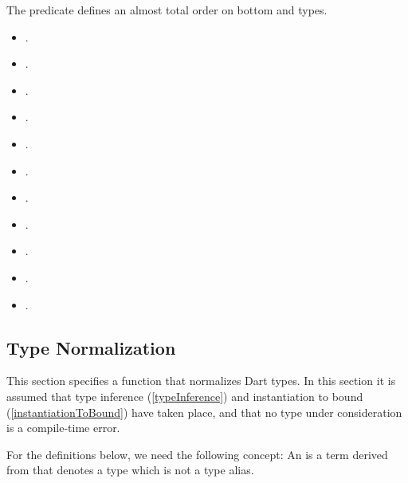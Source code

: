 \documentclass[makeidx]{article}
\begin{document}
\noindent
The \Index{\IsMoreBottomTypeName} predicate defines an almost total order on
bottom and  types.

\begin{itemize}
\item {}.
\item {}.
\item {}.
\item {}.
\item {}.
\item {}.
\item {}.
\item {}.
\item {}.
\item {}.
\item {}.
\end{itemize}


\subsection{Type Normalization}

\LMHash{}%
This section specifies a function that normalizes Dart types.
In this section it is assumed that type inference
(\ref{typeInference})
and instantiation to bound
(\ref{instantiationToBound})
have taken place,
and that no type under consideration is a compile-time error.

\LMHash{}%
For the definitions below, we need the following concept:
An 
is a term derived from 
that denotes a type which is not a type alias.

\end{document}
